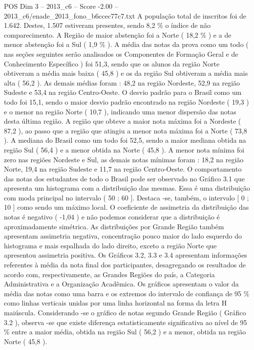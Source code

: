 \begin{textsample}{POS Dim 3 – 2013\_c6 – Score -2.00 – 2013\_c6/enade\_2013\_fono\_b6ccec77c7.txt}
A população total de inscritos foi de 1.642.
Destes, 1.507 estiveram presentes, sendo 8,2 \% o índice de não comparecimento.
A Região de maior abstenção foi a Norte ( 18,2 \% ) e a de menor abstenção foi a Sul ( 1,9 \% ).
A média das notas da prova como um todo ( nas seções seguintes serão analisados os Componentes de Formação Geral e de Conhecimento Específico ) foi 51,3, sendo que os alunos da região Norte obtiveram a média mais baixa ( 45,8 ) e os da região Sul obtiveram a média mais alta ( 56,2 ).
As demais médias foram : 48,2 na região Nordeste, 52,9 na região Sudeste e 53,4 na região Centro-Oeste.
O desvio padrão para o Brasil como um todo foi 15,1, sendo o maior desvio padrão encontrado na região Nordeste ( 19,3 ) e o menor na região Norte ( 10,7 ), indicando uma menor dispersão das notas desta última região.
A região que obteve a maior nota máxima foi a Nordeste ( 87,2 ), ao passo que a região que atingiu a menor nota máxima foi a Norte ( 73,8 ).
A mediana do Brasil como um todo foi 52,5, sendo a maior mediana obtida na região Sul ( 56,4 ) e a menor obtida na Norte ( 45,8 ).
A menor nota mínima foi zero nas regiões Nordeste e Sul, as demais notas mínimas foram : 18,2 na região Norte, 19,4 na região Sudeste e 11,7 na região Centro-Oeste.
O comportamento das notas dos estudantes de todo o Brasil pode ser observado no Gráfico 3.1 que apresenta um histograma com a distribuição das mesmas.
Essa é uma distribuição com moda principal no intervalo ( 50 ; 60 ].
Destaca -se, também, o intervalo [ 0 ; 10 ] como sendo um máximo local.
O coeficiente de assimetria da distribuição das notas é negativo ( -1,04 ) e não podemos considerar que a distribuição é aproximadamente simétrica.
As distribuições por Grande Região também apresentam assimetria negativa, concentração pouco maior do lado esquerdo do histograma e mais espalhada do lado direito, exceto a região Norte que apresentou assimetria positiva.
Os Gráficos 3.2, 3.3 e 3.4 apresentam informações referentes à média da nota final dos participantes, desagregando os resultados de acordo com, respectivamente, as Grandes Regiões do país, a Categoria Administrativa e a Organização Acadêmica.
Os gráficos apresentam o valor da média das notas como uma barra e os extremos do intervalo de confiança de 95 \% como linhas verticais unidas por uma linha horizontal na forma da letra H maiúscula.
Considerando -se o gráfico de notas segundo Grande Região ( Gráfico 3.2 ), observa -se que existe diferença estatisticamente significativa ao nível de 95 \% entre a maior média, obtida na região Sul ( 56,2 ) e a menor, obtida na região Norte ( 45,8 ).

\end{textsample}
